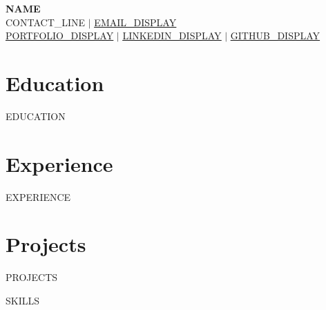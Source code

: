 \documentclass[letterpaper,11pt]{article}
\newcommand{\resumeSubHeadingListStart}{\begin{itemize}[leftmargin=0.15in, label={}]}
\newcommand{\resumeSubHeadingListEnd}{\end{itemize}}
\begin{document}
\begin{center}
    \textbf{\Huge \scshape {{NAME}}} \\ \vspace{1pt}
    {{CONTACT_LINE}} $|$
    \href{mailto:{{EMAIL_URL}}}{\underline{{{EMAIL_DISPLAY}}}} \\ \vspace{1pt}
    \href{{{PORTFOLIO_URL}}}{\underline{{{PORTFOLIO_DISPLAY}}}} $|$
    \href{{{LINKEDIN_URL}}}{\underline{{{LINKEDIN_DISPLAY}}}} $|$
    \href{{{GITHUB_URL}}}{\underline{{{GITHUB_DISPLAY}}}}
\end{center}

\section{Education}
  \resumeSubHeadingListStart
{{EDUCATION}}
  \resumeSubHeadingListEnd

\section{Experience}
  \resumeSubHeadingListStart
{{EXPERIENCE}}
  \resumeSubHeadingListEnd

\section{Projects}
  \resumeSubHeadingListStart
{{PROJECTS}}
  \resumeSubHeadingListEnd

{{SKILLS}}
\end{document}
